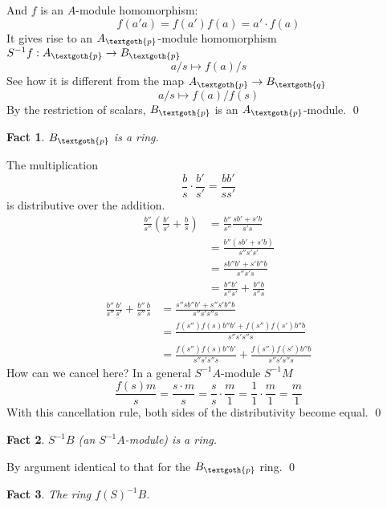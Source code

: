 \documentclass{article}
\newtheorem{theorem}{Fact}[section]
\begin{document}
\noindent
And $f$ is an $A$-module homomorphism:
\[
f(a'a) = f(a')f(a) = a' \cdot f(a)
\]
It gives rise to an $A_\textgoth{p}$-module homomorphism $S^{-1}f: A_\textgoth{p} \rightarrow B_\textgoth{p}$
\[
a/s \mapsto f(a)/s
\]
See how it is different from the map $A_\textgoth{p} \rightarrow B_\textgoth{q}$
\[
a/s \mapsto f(a)/f(s)
\]
By the restriction of scalars, $B_\textgoth{p}$ is an $A_\textgoth{p}$-module.
\qed

\bigskip
\begin{theorem}
$B_\textgoth{p}$ is a ring.
\end{theorem}

\noindent
The multiplication 
\[
\frac{b}{s} \cdot \frac{b'}{s'} = \frac{bb'}{ss'}
\]
is distributive over the addition.
\begin{equation*}
\begin{split}
\frac{b''}{s''} \left( \frac{b'}{s'} + \frac{b}{s} \right)
& = \frac{b''}{s''}\frac{sb' + s'b}{s's} \\
& = \frac{b''(sb' + s'b)}{s''s's'} \\
& = \frac{sb''b' + s'b''b}{s''s's} \\
& = \frac{b''b'}{s''s'} + \frac{b''b}{s''s}
\end{split}
\end{equation*}
\begin{equation*}
\begin{split}
\frac{b''}{s''} \frac{b'}{s'} + \frac{b''}{s''} \frac{b}{s}
& = \frac{s''sb''b' + s''s'b''b}{s''s's''s} \\
& = \frac{f(s'')f(s)b''b' + f(s'')f(s')b''b}{s''s's''s} \\
& = \frac{f(s'')f(s)b''b'}{s''s's''s} + \frac{f(s'')f(s')b''b}{s''s's''s}
\end{split}
\end{equation*}
How can we cancel here? In a general $S^{-1}A$-module $S^{-1}M$
\[
\frac{f(s)m}{s} = \frac{s \cdot m}{s} = \frac{s}{s} \cdot \frac{m}{1} = \frac{1}{1} \cdot \frac{m}{1} = \frac{m}{1}
\]
With this cancellation rule, both sides of the distributivity become equal.
\qed

\bigskip
\begin{theorem}
$S^{-1}B$ (an $S^{-1}A$-module)  is a ring.
\end{theorem}

\noindent
By argument identical to that for the $B_\textgoth{p}$ ring.
\qed

\bigskip
\begin{theorem}
The ring $f(S)^{-1}B$.
\end{theorem}
\end{document}
